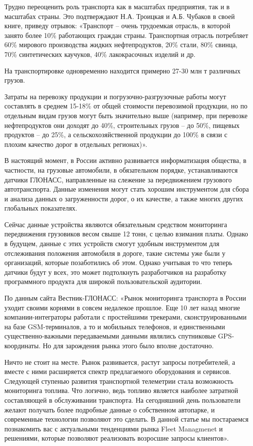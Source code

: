 \documentclass{lstu-diploma}
\begin{document}
Трудно переоценить роль транспорта как в масштабах предприятия, так и в
масштабах страны. Это подтверждают Н.А. Троицкая и А.Б. Чубаков в своей книге,
приведу отрывок: «Транспорт – очень трудоемкая отрасль, в которой занято более
10\% работающих граждан страны. Транспортная отрасль потребляет 60\% мирового
производства жидких нефтепродуктов, 20\% стали, 80\% свинца, 70\% синтетических
каучуков, 40\% лакокрасочных изделий и др.

На транспортировке одновременно находится примерно 27-30 млн т различных грузов.

Затраты на перевозку продукции и погрузочно-разгрузочные работы могут составлять
в среднем 15-18\% от общей стоимости перевозимой продукции, но по отдельным видам
грузов могут быть значительно выше (например, при перевозке нефтепродуктов они
доходят до 40\%, строительных грузов – до 50\%, пищевых продуктов – до 25\%, а
сельскохозяйственной продукции до 100\% в связи с плохим качество дорог в
отдельных регионах)».

В настоящий момент, в России активно развивается информатизация общества, в
частности, на грузовые автомобили, в обязательном порядке, устанавливаются
датчики ГЛОНАСС, направленные на слежение за передвижением грузового
автотранспорта. Данные изменения могут стать хорошим инструментом для сбора и
анализа данных о загруженности дорог, о их качестве, а также многих других
глобальных показателях.

Сейчас данные устройства являются обязательным средством мониторинга
передвижения грузовиков весом свыше 12 тонн, с целью взимания платы. Однако в
будущем, данные с этих устройств смогут удобным инструментом для отслеживания
положения автомобиля в дороге, такие  системы уже были у организаций, которые
позаботились об этом. Однако учитывая то что теперь датчики будут у всех, это
может подтолкнуть разработчиков на разработку программного продукта для широкой
пользовательской аудитории.

По данным сайта Вестник-ГЛОНАСС: «Рынок мониторинга транспорта в России уходит
своими корнями в совсем недалекое прошлое. Еще 10 лет назад многие
компании-интеграторы работали с простейшими трекерами, сконструированными на
базе GSM-терминалов, а то и мобильных телефонов, и единственными
существенно-важными передаваемыми данными являлись спутниковые GPS-координаты.
Но для зарождения рынка этого было вполне достаточно.

Ничто не стоит на месте. Рынок развивается, растут запросы потребителей, а
вместе с ними расширяется спектр предлагаемого оборудования и сервисов.
Следующей ступенью развития транспортной телеметрии стала возможность
мониторинга топлива. Что логично, ведь топливо является наиболее затратной
составляющей в обслуживании транспорта. На сегодняшний день пользователи желают
получать более подробные данные о собственном автопарке, и современные
технологии позволяют это сделать. В данной статье мы постараемся познакомить вас
с актуальными тенденциями рынка Fleet Managmenet и решениями, которые позволяют
реализовать возросшие запросы клиентов».
\end{document}
